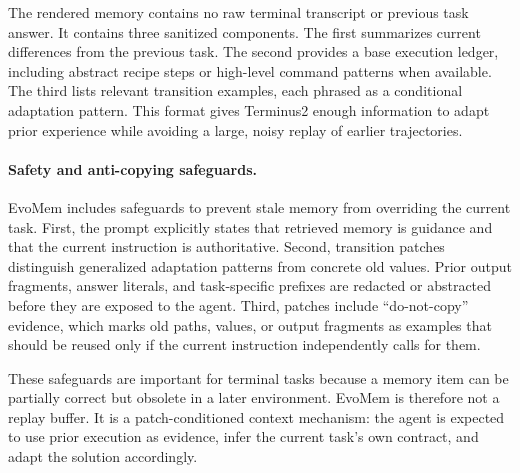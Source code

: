 \documentclass{llmxive}
\begin{document}
The rendered memory contains no raw terminal transcript or previous task answer. It contains three sanitized components. The first summarizes current differences from the previous task. The second provides a base execution ledger, including abstract recipe steps or high-level command patterns when available. The third lists relevant transition examples, each phrased as a conditional adaptation pattern. This format gives Terminus2 enough information to adapt prior experience while avoiding a large, noisy replay of earlier trajectories.

\paragraph{Safety and anti-copying safeguards.}
EvoMem includes safeguards to prevent stale memory from overriding the current task. First, the prompt explicitly states that retrieved memory is guidance and that the current instruction is authoritative. Second, transition patches distinguish generalized adaptation patterns from concrete old values. Prior output fragments, answer literals, and task-specific prefixes are redacted or abstracted before they are exposed to the agent. Third, patches include ``do-not-copy'' evidence, which marks old paths, values, or output fragments as examples that should be reused only if the current instruction independently calls for them.

These safeguards are important for terminal tasks because a memory item can be partially correct but obsolete in a later environment. EvoMem is therefore not a replay buffer. It is a patch-conditioned context mechanism: the agent is expected to use prior execution as evidence, infer the current task's own contract, and adapt the solution accordingly.
\end{document}

